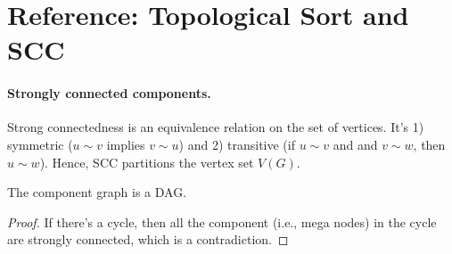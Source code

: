 \newpage
\section*{Reference: Topological Sort and SCC}
\paragraph{Strongly connected components.} Strong connectedness is an equivalence relation on the set of vertices. It's 1) symmetric ($u \sim v$ implies $v \sim u$) and 2) transitive (if $u \sim v$ and and $v \sim w$, then $u \sim w$). Hence, SCC partitions the vertex set $V(G)$.

\begin{claim}
The component graph is a DAG.
\end{claim}
\begin{proof}
If there's a cycle, then all the component (i.e., mega nodes) in the cycle are strongly connected, which is a contradiction.
\end{proof}

